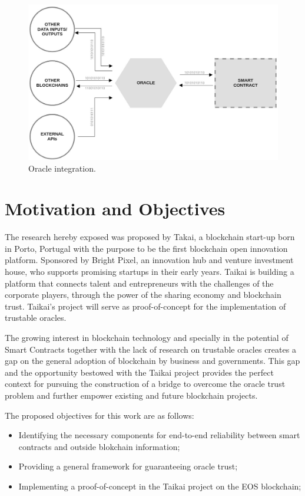 \begin{figure}[t]
  \begin{center}
    \leavevmode
    \includegraphics[width=\textwidth]{figures/oracle.jpg}
    \caption{Oracle integration.}
    \label{fig:/figures/oracle.jpg}
  \end{center}
\end{figure}

\section{Motivation and Objectives} \label{sec:goals}
The research hereby exposed was proposed by Takai, a blockchain start-up born in Porto, Portugal with the purpose to be the first blockchain open innovation platform. Sponsored by Bright Pixel, an innovation hub and venture investment house, who supports promising startups in their early years. Taikai is building a platform that connects talent and entrepreneurs with the challenges of the corporate players, through the power of the sharing economy and blockchain trust. Taikai's project will serve as proof-of-concept for the implementation of trustable oracles.

The growing interest in blockchain technology and specially in the potential of Smart Contracts together with the lack of research on trustable oracles creates a gap on the general adoption of blockchain by business and governments. This gap and the opportunity bestowed with the Taikai project provides the perfect context for pursuing the construction of a bridge to overcome the oracle trust problem and further empower existing and future blockchain projects.

The proposed objectives for this work are as follows:
\begin{itemize}
\item Identifying the necessary components for end-to-end reliability between smart contracts and outside blokchain information;
\item Providing a general framework for guaranteeing oracle trust;
\item Implementing a proof-of-concept in the Taikai project on the EOS blockchain;
\end{itemize}

